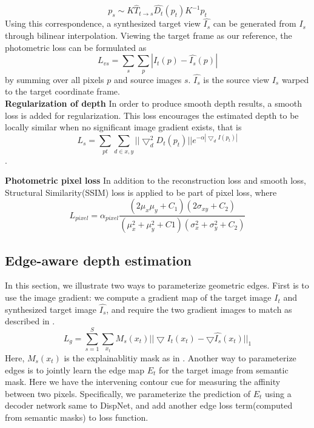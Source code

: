 \documentclass[10pt,twocolumn,letterpaper]{article}
\begin{document}
\begin{equation}
    p_s \sim K\hat{T}_{t\xrightarrow{}s}\hat{D_t}(p_t)K^{-1}p_t
\end{equation}
Using this correspondence, a synthesized target view $\hat{I_s}$ can be generated from $I_s$ through bilinear interpolation. Viewing the target frame as our reference, the photometric loss can be formulated as 
\begin{equation}
    L_{vs} = \sum_s\sum_p |I_t(p) - \hat{I_s}(p)|
\end{equation}
by summing over all pixels $p$ and source images $s$. $\hat{I_s}$ is the source view $I_s$ warped to the target coordinate frame.\\
\textbf{Regularization of depth} In order to produce smooth depth results, a smooth loss is added for regularization. This loss encourages the estimated depth to be locally similar when no significant image gradient exists, that is 
\begin{equation}
    L_s = \sum_{pt}\sum_{d\in x, y}||\bigtriangledown_d^2D_t(p_t)||e^{-\alpha|\bigtriangledown_dI(p_t)|}
\end{equation}.

\textbf{Photometric pixel loss} In addition to the reconstruction loss and smooth loss, Structural Similarity(SSIM)\cite{wang2004image} loss is applied to be part of pixel loss, where
\begin{equation}
    L_{pixel} = \alpha_{pixel} \frac{(2\mu_x\mu_y + C_1)(2\sigma_{xy} + C_2)}{(\mu_x^2 + \mu_y^2 + C1)(\sigma_x^2 + \sigma_y^2 + C_2)}
\end{equation}
\subsection{Edge-aware depth estimation}
In this section, we illustrate two ways to parameterize geometric edges. First is to use the image gradient: we compute a gradient map of the target image $I_t$ and synthesized target image $\hat{I_s}$, and require the two gradient images to match as described in \cite{yang2017unsupervised}.
\begin{equation}
    L_g = \sum_{s=1}^S\sum_{x_t}M_s(x_t)||\bigtriangledown I_t(x_t) - \bigtriangledown\hat{I_s}(x_t)||_1
\end{equation}
Here, $M_s(x_t)$ is the explainablitiy mask as in \cite{zhou2017unsupervised}. Another way to parameterize edges is to jointly learn the edge map $E_t$ for the target image from semantic mask. Here we have the intervening contour cue for measuring the affinity between two pixels. Specifically, we parameterize the prediction of $E_t$ using a decoder network same to DispNet, and add another edge loss term(computed from semantic masks) to loss function.
\end{document}
